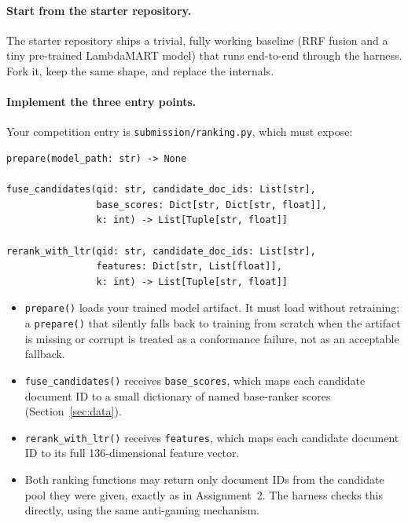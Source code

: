 \documentclass[10pt]{article}
\begin{document}
\paragraph{Start from the starter repository.}
The starter repository ships a trivial, fully working baseline (RRF fusion and a tiny pre-trained LambdaMART model) that runs end-to-end through the harness. Fork it, keep the same shape, and replace the internals.

\paragraph{Implement the three entry points.}
Your competition entry is \texttt{submission/ranking.py}, which must expose:

{\small
\begin{verbatim}
prepare(model_path: str) -> None

fuse_candidates(qid: str, candidate_doc_ids: List[str],
                base_scores: Dict[str, Dict[str, float]],
                k: int) -> List[Tuple[str, float]]

rerank_with_ltr(qid: str, candidate_doc_ids: List[str],
                features: Dict[str, List[float]],
                k: int) -> List[Tuple[str, float]]
\end{verbatim}
}

\begin{itemize}
  \item \texttt{prepare()} loads your trained model artifact. It must load without retraining: a \texttt{prepare()} that silently falls back to training from scratch when the artifact is missing or corrupt is treated as a conformance failure, not as an acceptable fallback.
  \item \texttt{fuse\_candidates()} receives \texttt{base\_scores}, which maps each candidate document ID to a small dictionary of named base-ranker scores (Section~\ref{sec:data}).
  \item \texttt{rerank\_with\_ltr()} receives \texttt{features}, which maps each candidate document ID to its full 136-dimensional feature vector.
  \item Both ranking functions may return only document IDs from the candidate pool they were given, exactly as in Assignment~2. The harness checks this directly, using the same anti-gaming mechanism.
\end{itemize}
\end{document}
